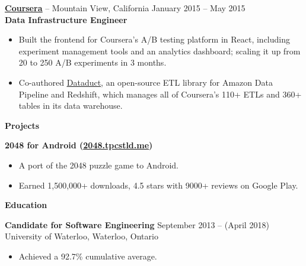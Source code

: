 \documentclass{letter}
\begin{document}
\vspace{-1.5mm}
{\bfseries \href{https://www.coursera.org}{\uline{Coursera}}} -- Mountain View, California \hfill January 2015 -- May 2015 \\
{\bfseries Data Infrastructure Engineer}
\vspace{-3mm}
\begin{itemize}
    \item Built the frontend for Coursera's A/B testing platform in React,
      including experiment management tools and an analytics dashboard; scaling
      it up from 20 to 250 A/B experiments in 3 months.
    \item Co-authored \href{https://github.com/coursera/dataduct}{\uline{Dataduct}},
      an open-source ETL library for Amazon Data Pipeline and Redshift, which
      manages all of Coursera's 110+ ETLs and 360+ tables in its data warehouse.
\end{itemize}


{\bfseries \Large Projects}

\vspace{-10mm}
\null\hrulefill

\vspace{-1.5mm}
{\bfseries 2048 for Android (\href{http://2048.tpcstld.me}{\uline{2048.tpcstld.me}})}
\vspace{-3mm}
\begin{itemize}
    \item A port of the 2048 puzzle game to Android.
    \item Earned 1,500,000+ downloads, 4.5 stars with 9000+ reviews on Google
      Play.
\end{itemize}

{\bfseries \Large Education}

\vspace{-10mm}
\null\hrulefill

\vspace{-1.5mm}
{\bfseries Candidate for Software Engineering} \hfill September 2013 -- (April 2018)\\
University of Waterloo, Waterloo, Ontario
\vspace{-3mm}
\begin{itemize}
    \item Achieved a 92.7\% cumulative average.
\end{itemize}
\end{document}
